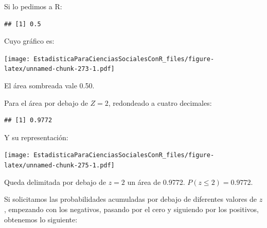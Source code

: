 \documentclass[]{book}
\begin{document}
Si lo pedimos a R:

\begin{verbatim}
## [1] 0.5
\end{verbatim}

Cuyo gráfico es:

\texttt{[image: EstadisticaParaCienciasSocialesConR\_files/figure-latex/unnamed-chunk-273-1.pdf]}

El área sombreada vale 0.50.

Para el área por debajo de \(Z=2\), redondeado a cuatro decimales:

\begin{verbatim}
## [1] 0.9772
\end{verbatim}

Y su representación:

\texttt{[image: EstadisticaParaCienciasSocialesConR\_files/figure-latex/unnamed-chunk-275-1.pdf]}

Queda delimitada por debajo de \(z=2\) un área de 0.9772. \(P(z\leq2)=0.9772\).

Si solicitamos las probabilidades acumuladas por debajo de diferentes valores de \(z\), empezando con los negativos, pasando por el cero y siguiendo por los positivos, obtenemos lo siguiente:
\end{document}
